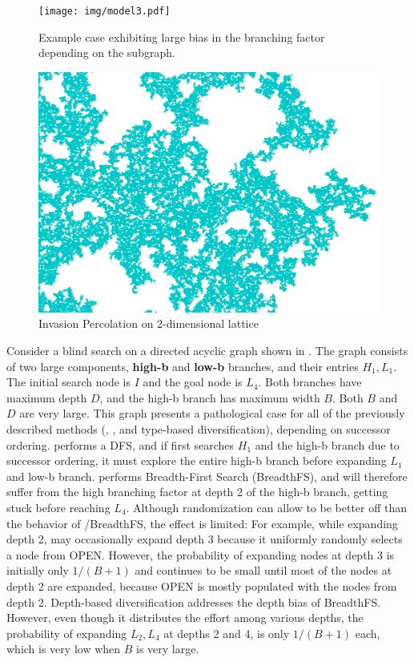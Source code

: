 \begin{figure}[hbt]
   \centering
 \begin{minipage}{3.25in}
   \centering
 \texttt{[image: img/model3.pdf]}
 \caption{Example case exhibiting large bias in the branching factor depending on the subgraph.}
 \label{fig:model}
 \end{minipage}
\begin{minipage}{3.25in}
  \centering
 \includegraphics[width=0.5\linewidth]{img/static/ip.png}
 \caption{Invasion Percolation on 2-dimensional lattice}
 \label{fig:ip}
\end{minipage}
\end{figure}

Consider a blind search on a directed acyclic graph
shown in .
The graph consists of two large components, \textbf{high-b} and \textbf{low-b} branches, and their entries $H_1,L_1$. The initial search node is $I$ and the goal node is $L_4$.
Both branches have maximum depth $D$, and the high-b branch has maximum width $B$.
Both $B$ and $D$ are very large.
This graph presents a pathological case for all of the previously described methods (\lifo, \fifo, \ro and type-based diversification), depending on successor ordering.
\lifo performs a DFS, and if \lifo first searches $H_1$ and the high-b branch due to successor ordering, it must explore the entire high-b branch before expanding $L_1$ and low-b branch.
\fifo performs Breadth-First Search (BreadthFS), and  will therefore suffer from the  high branching factor at depth 2 of the high-b branch, getting stuck before reaching $L_4$.
Although randomization can allow \ro to be better off than the behavior of \fifo/BreadthFS, the effect is limited:
For example, while expanding depth 2, \ro may occasionally expand depth 3 because it uniformly randomly selects a node from OPEN.
However, the probability of expanding nodes at depth 3 is initially only $1/(B+1)$ and continues to be small until  most of the nodes at depth 2 are expanded, 
because OPEN is mostly populated with the nodes from depth 2.
Depth-based diversification addresses the depth bias of BreadthFS.
However, even though it distributes the effort among various depths,
the probability of expanding $L_2,L_4$ at depths 2 and 4, is only $1/(B+1)$ each, which is very low when $B$ is very large.


